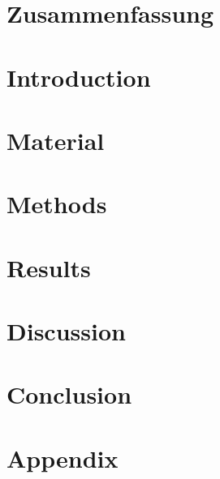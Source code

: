 \documentclass[
oneside,
a4paper,
12pt,
titlepage]
{article}
\begin{document}

\newpage


\newpage


\newpage

\section{Zusammenfassung}


\pagestyle{standard}

\newpage
\section{Introduction}


\section{Material}



\section{Methods}






\section{Results}








\section{Discussion}







\section{Conclusion}


\newpage{}


\newpage{}
\setcounter{section}{0}
\renewcommand{\thesection}{\Alph{section}}
\section{Appendix}


\newpage{}

\end{document}
